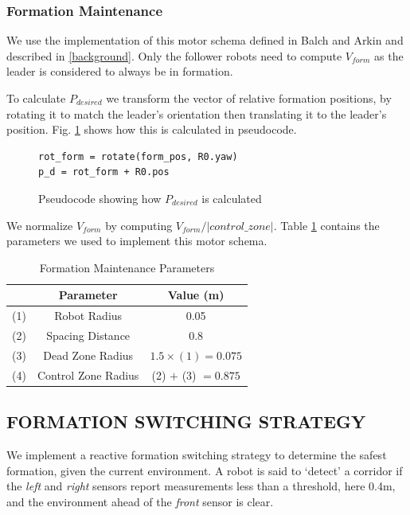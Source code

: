 \documentclass[letterpaper, 10 pt, conference]{ieeeconf}  %
\begin{document}
\subsubsection*{Formation Maintenance}

We use the implementation of this motor schema defined in Balch and Arkin and described in \ref{background}. Only the follower robots need to compute $V_{form}$ as the leader is considered to always be in formation.

To calculate $P_{desired}$ we transform the vector of relative formation positions, by rotating it to match the leader's orientation then translating it to the leader's position. Fig. \ref{desired_position} shows how this is calculated in pseudocode.

\begin{figure}[thpb]
\centering
\lstset{language=python}
\begin{lstlisting}
rot_form = rotate(form_pos, R0.yaw)
p_d = rot_form + R0.pos
\end{lstlisting}
\caption{Pseudocode showing how $P_{desired}$ is calculated}
\label{desired_position}
\end{figure}

We normalize $V_{form}$ by computing $V_{form}/|control\_zone|$. Table \ref{table_formation} contains the parameters we used to implement this motor schema.

\begin{table}[h]
\begin{center}
\begin{tabular}{|c|c|c|}
\hline
& Parameter & Value (m) \\
\hline
(1) & Robot Radius             & 0.05 \\
(2) & Spacing Distance        & 0.8 \\
(3) & Dead Zone Radius      & $1.5 \times (1) = 0.075$ \\
(4) & Control Zone Radius    & (2) $+$ (3) $=0.875$ \\
\hline
\end{tabular}
\end{center}
\caption{Formation Maintenance Parameters}
\label{table_formation}
\end{table}

\subsection{FORMATION SWITCHING STRATEGY}

We implement a reactive formation switching strategy to determine the safest formation, given the current environment. A robot is said to `detect' a corridor if the \textit{left} and \textit{right} sensors report measurements less than a threshold, here 0.4m, and the environment ahead of the \textit{front} sensor is clear.
\end{document}
